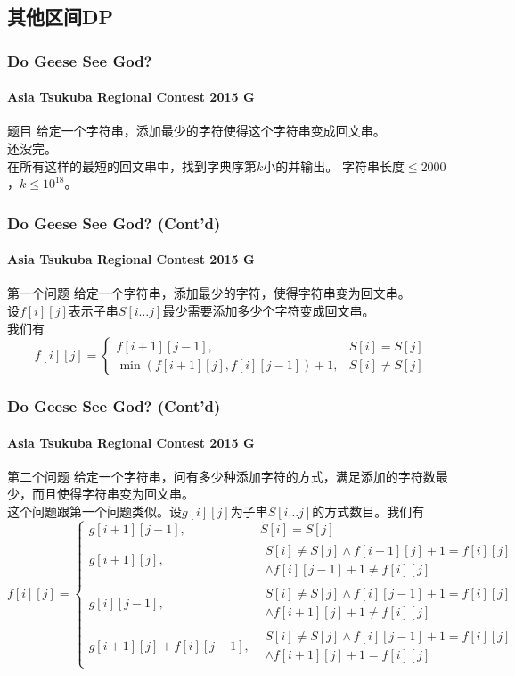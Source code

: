 \documentclass[hyperref={unicode=true}]{beamer}
\theoremstyle{definition}
\theoremstyle{proof}
\begin{document}
\subsection{其他区间DP}
\begin{frame}\frametitle{Do Geese See God?}
  \framesubtitle{Asia Tsukuba Regional Contest 2015 G}
  \begin{block}{题目}
    给定一个字符串，添加最少的字符使得这个字符串变成回文串。\\
    \pause{}还没完。\\
    在所有这样的最短的回文串中，找到字典序第$k$小的并输出。
    字符串长度$\leq 2000$，$k \leq 10^{18}$。
  \end{block}
\end{frame}
\begin{frame}\frametitle{Do Geese See God? (Cont'd)}
  \framesubtitle{Asia Tsukuba Regional Contest 2015 G}
  \begin{alertblock}{第一个问题}
    给定一个字符串，添加最少的字符，使得字符串变为回文串。\\
    \pause{}设$f[i][j]$表示子串$S[i\ldots j]$最少需要添加多少个字符变成回文串。\\
    我们有
\[f[i][j]=\begin{cases}
f[i+1][j-1], &S[i]=S[j]\\
\min{(f[i+1][j], f[i][j-1])} + 1, &S[i] \neq S[j]
\end{cases}\]
  \end{alertblock}
\end{frame}
\begin{frame}\frametitle{Do Geese See God? (Cont'd)}
  \framesubtitle{Asia Tsukuba Regional Contest 2015 G}
  \begin{alertblock}{第二个问题}
    给定一个字符串，问有多少种添加字符的方式，满足添加的字符数最少，而且使得字符串变为回文串。\\
    \pause{}这个问题跟第一个问题类似。设$g[i][j]$为子串$S[i \ldots j]$的方式数目。我们有
\[f[i][j]=\begin{cases}
g[i+1][j-1], &S[i] = S[j]\\
g[i+1][j], &\substack{S[i]\neq S[j] \wedge f[i+1][j]+1=f[i][j] \\\wedge f[i][j-1]+1\neq f[i][j]}\\
g[i][j-1], &\substack{S[i] \neq S[j] \wedge f[i][j-1]+1 = f[i][j] \\\wedge f[i+1][j]+1 \neq f[i][j]}\\
g[i+1][j] + f[i][j-1], &\substack{S[i] \neq S[j] \wedge f[i][j-1]+1 = f[i][j] \\\wedge f[i+1][j] +1=f[i][j]}
\end{cases}\]
  \end{alertblock}
\end{frame}
\end{document}
